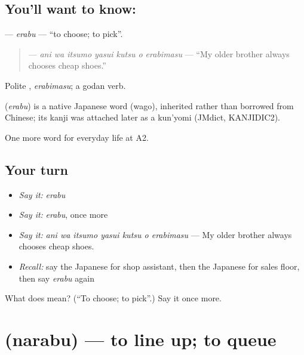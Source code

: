 \subsection*{You'll want to know: }
\textbf{} — \emph{erabu} — \textquotedblleft{}to choose; to pick\textquotedblright{}.

\begin{quote}
\textbf{    } — \emph{ani wa itsumo yasui kutsu o erabimasu} — \textquotedblleft{}My older brother always chooses cheap shoes.\textquotedblright{}
\end{quote}

Polite \textbf{}, \emph{erabimasu}; a godan verb.

\begin{cousinweb}
\textbf{} (\emph{erabu}) is a native Japanese word (wago), inherited rather than borrowed from Chinese; its kanji was attached later as a kun'yomi (JMdict, KANJIDIC2).
\end{cousinweb}

\begin{grammarlens}[title={What you've built}]
One more word for everyday life at A2.
\end{grammarlens}

\subsection*{Your turn}
\begin{itemize}
\raggedright
  \item \emph{Say it:} \emph{erabu}
  \item \emph{Say it:} \emph{erabu}, once more
  \item \emph{Say it:} \emph{ani wa itsumo yasui kutsu o erabimasu} — My older brother always chooses cheap shoes.
  \item \emph{Recall:} say the Japanese for shop assistant, then the Japanese for sales floor, then say \emph{erabu} again
\end{itemize}

\begin{tcolorbox}[breakable,colback=teal!4,colframe=teal!35!black,title={Before you move on}]
What does  mean? (\textquotedblleft{}To choose; to pick\textquotedblright{}.) Say it once more.
\end{tcolorbox}
\section[\texorpdfstring{\ja{ならぶ} (narabu)}{ならぶ (narabu)}]{ (narabu) — to line up; to queue}

